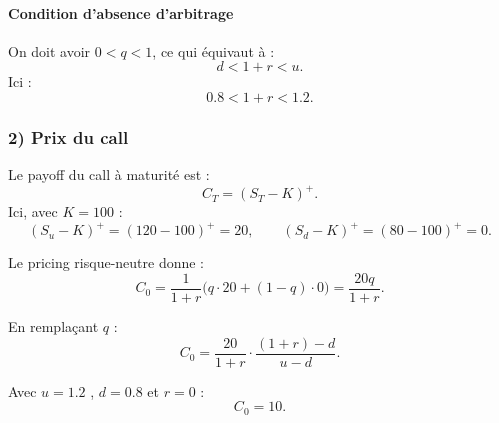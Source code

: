 \paragraph{Condition d'absence d'arbitrage}
On doit avoir $0<q<1$, ce qui équivaut à :
\[
d<1+r<u.
\]
Ici :
\[
0.8 < 1+r < 1.2.
\]

\subsubsection*{2) Prix du call}

Le payoff du call à maturité est :
\[
C_T=(S_T-K)^+.
\]
Ici, avec $K=100$ :
\[
(S_u-K)^+=(120-100)^+=20,\qquad (S_d-K)^+=(80-100)^+=0.
\]

Le pricing risque-neutre donne :
\[
C_0=\frac{1}{1+r}\Big(q\cdot 20 + (1-q)\cdot 0\Big)
=\frac{20q}{1+r}.
\]

En remplaçant $q$ :
\[
\boxed{
C_0=\frac{20}{1+r}\cdot \frac{(1+r)-d}{u-d}
}.
\]

Avec $u=1.2$ , $d=0.8$ et $r=0$ :
\[
\boxed{
C_0=10.
}
\]

